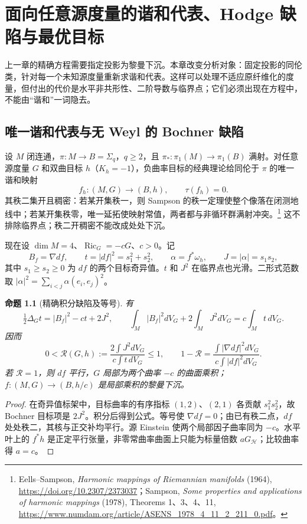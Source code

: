 \documentclass[UTF8,fontset=fandol,zihao=-4,oneside,openany]{ctexbook}
\theoremstyle{cjkplain}
\newtheorem{proposition}[theorem]{命题}
\numberwithin{equation}{chapter}
\begin{document}
\chapter{面向任意源度量的谐和代表、Hodge 缺陷与最优目标}
\label{SUB:harmonic-chapter}

上一章的精确方程需要指定投影为黎曼下沉。本章改变分析对象：固定投影的同伦类，针对每一个未知源度量重新求谐和代表。这样可以处理不适应原纤维化的度量，但付出的代价是水平非共形性、二阶导数与临界点；它们必须出现在方程中，不能由“谐和”一词隐去。

\section{唯一谐和代表与无 Weyl 的 Bochner 缺陷}

设 $M$ 闭连通，$\pi:M\to B=\Sigma_q$，$q\ge2$，且
$\pi_*:\pi_1(M)\to\pi_1(B)$ 满射。对任意源度量 $G$ 和双曲目标 $h$（$K_h=-1$），负曲率目标的经典理论给同伦于 $\pi$ 的唯一谐和映射
\begin{equation}\label{SUB:harmonic-representative}
f_h:(M,G)\longrightarrow(B,h),\qquad\tau(f_h)=0.
\end{equation}
其秩二集开且稠密：若某开集秩一，则 Sampson 的秩一定理使整个像落在闭测地线中；若某开集秩零，唯一延拓使映射常值，两者都与非循环群满射冲突。\footnote{Eells--Sampson, \emph{Harmonic mappings of Riemannian manifolds} (1964), \url{https://doi.org/10.2307/2373037}；Sampson, \emph{Some properties and applications of harmonic mappings} (1978), Theorems 1、3、4、11, \url{https://www.numdam.org/article/ASENS_1978_4_11_2_211_0.pdf}。}
这不排除临界点；秩二开稠密不能改成处处下沉。

现在设 $\dim M=4$、$\operatorname{Ric}_G=-cG$、$c>0$。记
\[
B_f=\nabla df,\qquad t=|df|^2=s_1^2+s_2^2,
\qquad\alpha=f^*\omega_h,\qquad J=|\alpha|=s_1s_2,
\]
其中 $s_1\ge s_2\ge0$ 为 $df$ 的两个目标奇异值。$t$ 和 $J^2$ 在临界点也光滑。二形式范数取 $|\alpha|^2=\sum_{i<j}\alpha(e_i,e_j)^2$。

\begin{proposition}[精确积分缺陷及等号]\label{SUB:harmonic-bochner}
有
\begin{equation}\label{SUB:harmonic-bochner-equation}
\tfrac12\Delta_Gt=|B_f|^2-ct+2J^2,
\qquad
\int_M|B_f|^2dV_G+2\int_MJ^2dV_G=c\int_Mt\,dV_G.
\end{equation}
因而
\begin{equation}\label{SUB:harmonic-ratio}
0<\mathcal R(G,h):=\frac{2\int J^2dV_G}{c\int t\,dV_G}\le1,
\qquad
1-\mathcal R=\frac{\int|\nabla df|^2dV_G}{c\int|df|^2dV_G}.
\end{equation}
若 $\mathcal R=1$，则 $df$ 平行，$G$ 局部为两个曲率 $-c$ 的曲面乘积；
$f:(M,G)\to(B,h/c)$ 是局部乘积的黎曼下沉。
\end{proposition}
\begin{proof}
在奇异值标架中，目标曲率的有序指标 $(1,2)$、$(2,1)$ 各贡献 $s_1^2s_2^2$，故 Bochner 目标项是 $2J^2$。积分后得到公式。等号使 $\nabla df=0$；由已有秩二点，$df$ 处处秩二，其核与正交补均平行。源 Einstein 使两个局部因子曲率同为 $-c$。水平叶上的 $f^*h$ 是正定平行张量，非零常曲率曲面上只能为标量倍数 $aG_{\mathcal H}$；比较曲率得 $a=c$。
\end{proof}
\end{document}

